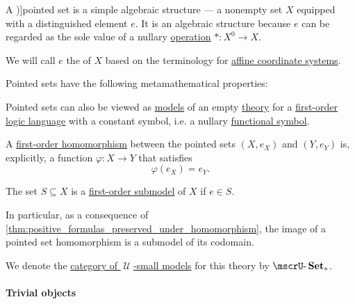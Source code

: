 \begin{definition}\label{def:pointed_set}
  A \term[ru=множество с отмеченной точкой (\cite[16]{ЦаленкоШульгейфер1974ОсновыТеорииКатегорий})]{pointed set} is a simple algebraic structure --- a nonempty set \( X \) equipped with a distinguished element \( e \). It is an algebraic structure because \( e \) can be regarded as the sole value of a nullary \hyperref[def:operation_on_set]{operation} \( \ast: X^0 \to X \).

  We will call \( e \) the  of \( X \) based on the terminology for \hyperref[def:affine_coordinate_system]{affine coordinate systems}.

  Pointed sets have the following metamathematical properties:
  \begin{thmenum}
    \mimprovised Pointed sets can also be viewed as \hyperref[def:first_order_model]{models} of an empty \hyperref[def:first_order_theory]{theory} for a \hyperref[def:first_order_language]{first-order logic language} with a constant symbol, i.e. a nullary \hyperref[def:first_order_language/fun]{functional symbol}.

     A \hyperref[def:first_order_homomorphism]{first-order homomorphism} between the pointed sets \( (X, e_{X}) \) and \( (Y, e_{Y}) \) is, explicitly, a function \( \varphi: X \to Y \) that satisfies
    \begin{equation}\label{eq:def:pointed_set/homomorphism}
      \varphi(e_{X}) = e_{Y}.
    \end{equation}

     The set \( S \subseteq X \) is a \hyperref[def:first_order_submodel]{first-order submodel} of \( X \) if \( e \in S \).

    In particular, as a consequence of \cref{thm:positive_formulas_preserved_under_homomorphism}, the image of a pointed set homomorphism is a submodel of its codomain.

     We denote the \hyperref[def:category_of_small_first_order_models]{category of \( \mscrU \)-small models} for this theory by \( \ucat{Set}_* \).
  \end{thmenum}
\end{definition}

\paragraph{Trivial objects}

